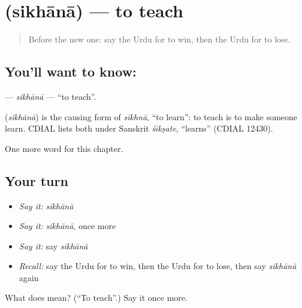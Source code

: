 \section[\texorpdfstring{\ur{سکھانا} (sikhānā)}{سکھانا (sikhānā)}]{ (sikhānā) — to teach}

\label{lesson:UR-C140-sikhana}



\begin{quote}
Before the new one: say the Urdu for to win, then the Urdu for to lose.
\end{quote}

\subsection*{You'll want to know: }
\textbf{} — \emph{sikhānā} — \textquotedblleft{}to teach\textquotedblright{}.

\begin{cousinweb}
\textbf{} (\emph{sikhānā}) is the causing form of \emph{sīkhnā}, \textquotedblleft{}to learn\textquotedblright{}: to teach is to make someone learn. CDIAL lists both under Sanskrit \emph{śikṣate}, \textquotedblleft{}learns\textquotedblright{} (CDIAL 12430).
\end{cousinweb}

\begin{grammarlens}[title={What you've built}]
One more word for this chapter.
\end{grammarlens}

\subsection*{Your turn}
\begin{itemize}
\raggedright
  \item \emph{Say it:} \emph{sikhānā}
  \item \emph{Say it:} \emph{sikhānā}, once more
  \item \emph{Say it:} say \emph{sikhānā}
  \item \emph{Recall:} say the Urdu for to win, then the Urdu for to lose, then say \emph{sikhānā} again
\end{itemize}

\begin{tcolorbox}[breakable,colback=teal!4,colframe=teal!35!black,title={Before you move on}]
What does  mean? (\textquotedblleft{}To teach\textquotedblright{}.) Say it once more.
\end{tcolorbox}
